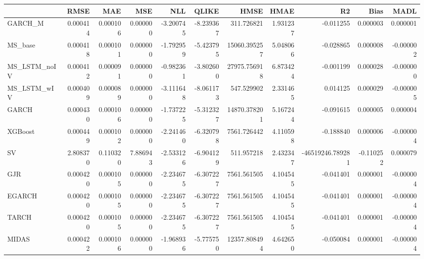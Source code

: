 \begin{tabular}{lrrrrrrrrrr}
\toprule
 & RMSE & MAE & MSE & NLL & QLIKE & HMSE & HMAE & R2 & Bias & MADL \\
\midrule
GARCH_M & 0.000414 & 0.000106 & 0.000000 & -3.200745 & -8.239367 & 311.726821 & 1.931237 & -0.011255 & 0.000003 & 0.000001 \\
MS_base & 0.000418 & 0.000101 & 0.000000 & -1.792959 & -5.423795 & 15060.395257 & 5.048066 & -0.028865 & 0.000008 & -0.000002 \\
MS_LSTM_noIV & 0.000412 & 0.000091 & 0.000000 & -0.982361 & -3.802600 & 27975.756918 & 6.873424 & -0.001199 & 0.000028 & -0.000000 \\
MS_LSTM_wIV & 0.000409 & 0.000089 & 0.000000 & -3.111648 & -8.061173 & 547.529902 & 2.331465 & 0.014125 & 0.000029 & -0.000005 \\
GARCH & 0.000430 & 0.000106 & 0.000000 & -1.737225 & -5.312327 & 14870.378201 & 5.167244 & -0.091615 & 0.000005 & 0.000004 \\
XGBoost & 0.000449 & 0.000102 & 0.000000 & -2.241460 & -6.320798 & 7561.726442 & 4.110598 & -0.188840 & 0.000006 & -0.000004 \\
SV & 2.808370 & 0.110320 & 7.886943 & -2.533126 & -6.904129 & 511.957218 & 2.432347 & -46519246.789281 & -0.110252 & 0.000079 \\
GJR & 0.000420 & 0.000105 & 0.000000 & -2.234675 & -6.307227 & 7561.561505 & 4.104545 & -0.041401 & 0.000001 & -0.000004 \\
EGARCH & 0.000420 & 0.000105 & 0.000000 & -2.234675 & -6.307227 & 7561.561505 & 4.104545 & -0.041401 & 0.000001 & -0.000004 \\
TARCH & 0.000420 & 0.000105 & 0.000000 & -2.234675 & -6.307227 & 7561.561505 & 4.104545 & -0.041401 & 0.000001 & -0.000004 \\
MIDAS & 0.000422 & 0.000106 & 0.000000 & -1.968936 & -5.775750 & 12357.808494 & 4.642650 & -0.050084 & 0.000001 & -0.000004 \\
\bottomrule
\end{tabular}
